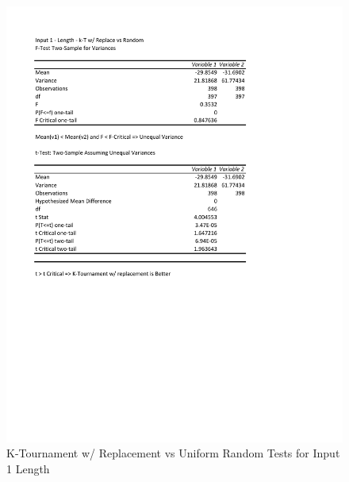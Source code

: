 \documentclass[times]{article}
\begin{document}
	\begin{figure}
		\caption{K-Tournament w/ Replacement vs Uniform Random Tests for Input 1 Length}
		\label{fig:1parent2}
		\includegraphics[width=\textwidth]{./t_test/1_parent2.pdf}
	\end{figure}
\end{document}
